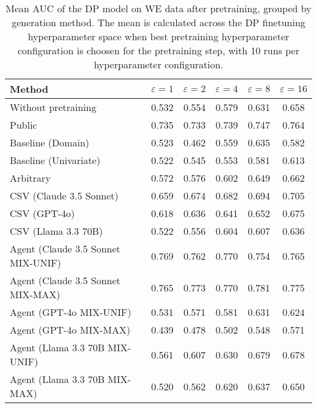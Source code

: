 \begin{table}[h!]
    \centering
    \caption{Mean AUC of the DP model on WE data after pretraining, grouped by generation method. The mean is calculated across the DP finetuning hyperparameter space when best pretraining hyperparameter configuration is choosen for the pretraining step, with 10 runs per hyperparameter configuration.}
    \label{tab:epsilon_comparison}
    \begin{tabular}{lccccc}
    \toprule
    Method & $\varepsilon=1$ & $\varepsilon=2$ & $\varepsilon=4$ & $\varepsilon=8$ & $\varepsilon=16$ \\
    \midrule
    Without pretraining & 0.532 & 0.554 & 0.579 & 0.631 & 0.658 \\
    \arrayrulecolor{black!50!}\midrule
    Public & \cellcolor{bronze!30}0.735 & \cellcolor{bronze!30}0.733 & \cellcolor{silver!30}0.739 & \cellcolor{bronze!30}0.747 & \cellcolor{bronze!30}0.764 \\
    \arrayrulecolor{black!50!}\midrule
    Baseline (Domain) & 0.523 & 0.462 & 0.559 & 0.635 & 0.582 \\
    Baseline (Univariate) & 0.522 & 0.545 & 0.553 & 0.581 & 0.613 \\
    \arrayrulecolor{black!50!}\midrule
    Arbitrary & 0.572 & 0.576 & 0.602 & 0.649 & 0.662 \\
    \arrayrulecolor{black!50!}\midrule
    CSV (Claude 3.5 Sonnet) & 0.659 & 0.674 & 0.682 & 0.694 & 0.705 \\
    CSV (GPT-4o) & 0.618 & 0.636 & 0.641 & 0.652 & 0.675 \\
    CSV (Llama 3.3 70B) & 0.522 & 0.556 & 0.604 & 0.607 & 0.636 \\
    \arrayrulecolor{black!50!}\midrule
    Agent (Claude 3.5 Sonnet MIX-UNIF) & \cellcolor{gold!30}0.769 & \cellcolor{silver!30}0.762 & \cellcolor{gold!30}0.770 & \cellcolor{silver!30}0.754 & \cellcolor{silver!30}0.765 \\
    Agent (Claude 3.5 Sonnet MIX-MAX) & \cellcolor{silver!30}0.765 & \cellcolor{gold!30}0.773 & \cellcolor{gold!30}0.770 & \cellcolor{gold!30}0.781 & \cellcolor{gold!30}0.775 \\
    Agent (GPT-4o MIX-UNIF) & 0.531 & 0.571 & 0.581 & 0.631 & 0.624 \\
    Agent (GPT-4o MIX-MAX) & 0.439 & 0.478 & 0.502 & 0.548 & 0.571 \\
    Agent (Llama 3.3 70B MIX-UNIF) & 0.561 & 0.607 & 0.630 & 0.679 & 0.678 \\
    Agent (Llama 3.3 70B MIX-MAX) & 0.520 & 0.562 & 0.620 & 0.637 & 0.650 \\

\end{tabular}
\end{table}
